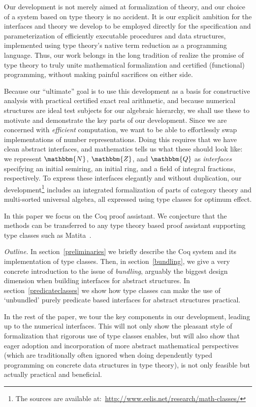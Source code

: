 \documentclass[a4paper,10pt,runningheads]{llncs}
\newcommand{\N}{\ensuremath{\mathbbm{N}}}
\newcommand{\Z}{\ensuremath{\mathbbm{Z}}}
\newcommand{\Q}{\ensuremath{\mathbbm{Q}}}
\begin{document}
Our development is not merely aimed at formalization of theory, and our choice of a system based on type theory is no accident. It is our explicit ambition for the interfaces and theory we develop to be employed directly for the specification and parameterization of efficiently executable procedures and data structures, implemented using type theory's native term reduction as a programming language. Thus, our work belongs in the long tradition of realize the promise of type theory to truly unite mathematical formalization and certified (functional) programming, without making painful sacrifices on either side.

Because our ``ultimate'' goal is to use this development as a basis for constructive analysis with practical certified exact real arithmetic, and because numerical structures are ideal test subjects for our algebraic hierarchy, we shall use these to motivate and demonstrate the key parts of our development. Since we are concerned with \emph{efficient} computation, we want to be able to effortlessly swap implementations of number representations. Doing this requires that we have clean abstract interfaces, and mathematics tells us what these should look like: we represent $\N$, $\Z$, and $\Q$ as \emph{interfaces} specifying an initial semiring, an initial ring, and a field of integral fractions, respectively. To express these interfaces elegantly and without duplication, our development\footnote{The sources are available at:~\url{http://www.eelis.net/research/math-classes/}} includes an integrated formalization of parts of category theory and multi-sorted universal algebra, all expressed using type classes for optimum effect.

In this paper we focus on the Coq proof assistant. We conjecture that the methods can be transferred
to any type theory based proof assistant supporting type classes such as
Matita~\cite{asperti2007user}.

\emph{Outline.}
In section~\ref{preliminaries} we briefly describe the Coq system and its implementation of type classes. Then, in section~\ref{bundling}, we give a very concrete introduction to the issue of \emph{bundling}, arguably the biggest design dimension when building interfaces for abstract structures. In section~\ref{predicateclasses} we show how type classes can make the use of `unbundled' purely predicate based interfaces for abstract structures practical.

In the rest of the paper, we tour the key components in our development, leading up to the numerical interfaces. This will not only show the pleasant style of formalization that rigorous use of type classes enables, but will also show that eager adoption and incorporation of more abstract mathematical perspectives (which are traditionally often ignored when doing dependently typed programming on concrete data structures in type theory), is not only feasible but actually practical and beneficial.
\end{document}
